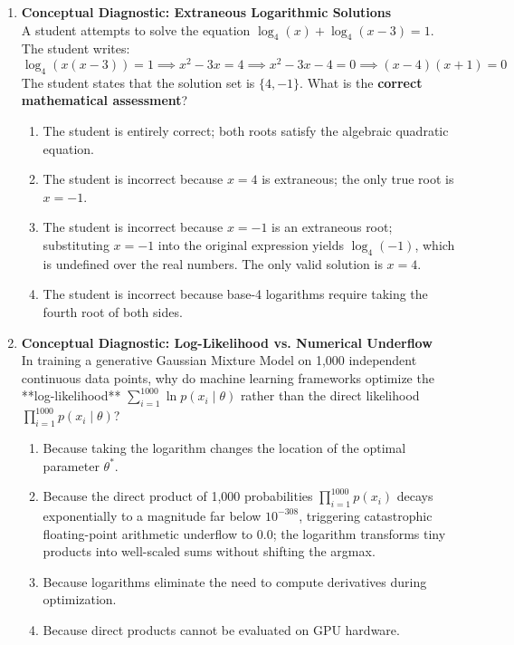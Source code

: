 \begin{enumerate}[resume]
\item \textbf{Conceptual Diagnostic: Extraneous Logarithmic Solutions} \\
A student attempts to solve the equation $\log_4(x) + \log_4(x - 3) = 1$. The student writes:
$$\log_4(x(x - 3)) = 1 \implies x^2 - 3x = 4 \implies x^2 - 3x - 4 = 0 \implies (x - 4)(x + 1) = 0$$
The student states that the solution set is $\{4, -1\}$. What is the \textbf{correct mathematical assessment}?
\begin{enumerate}
    \item The student is entirely correct; both roots satisfy the algebraic quadratic equation.
    \item The student is incorrect because $x = 4$ is extraneous; the only true root is $x = -1$.
    \item The student is incorrect because $x = -1$ is an extraneous root; substituting $x = -1$ into the original expression yields $\log_4(-1)$, which is undefined over the real numbers. The only valid solution is $x = 4$.
    \item The student is incorrect because base-4 logarithms require taking the fourth root of both sides.
\end{enumerate}

\item \textbf{Conceptual Diagnostic: Log-Likelihood vs. Numerical Underflow} \\
In training a generative Gaussian Mixture Model on 1,000 independent continuous data points, why do machine learning frameworks optimize the **log-likelihood** $\sum_{i=1}^{1000} \ln p(x_i \mid \theta)$ rather than the direct likelihood $\prod_{i=1}^{1000} p(x_i \mid \theta)$?
\begin{enumerate}
    \item Because taking the logarithm changes the location of the optimal parameter $\theta^*$.
    \item Because the direct product of 1,000 probabilities $\prod_{i=1}^{1000} p(x_i)$ decays exponentially to a magnitude far below $10^{-308}$, triggering catastrophic floating-point arithmetic underflow to $0.0$; the logarithm transforms tiny products into well-scaled sums without shifting the argmax.
    \item Because logarithms eliminate the need to compute derivatives during optimization.
    \item Because direct products cannot be evaluated on GPU hardware.
\end{enumerate}
\end{enumerate}